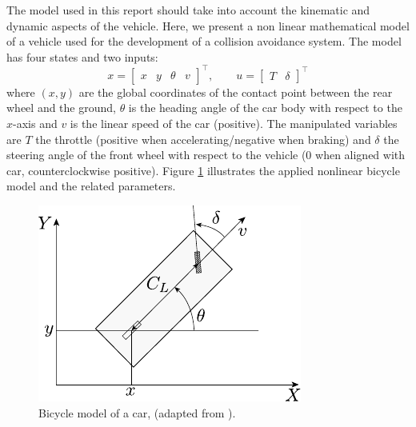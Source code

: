 \documentclass[conference,11pt]{IEEEtran}
\renewcommand{\vec}[1]{\ensuremath{\boldsymbol{\mathit{#1}}}}
\begin{document}
The model used in this report should take into account the kinematic and dynamic aspects of the vehicle. Here, we present a non linear mathematical model of a vehicle used for the development of a collision avoidance system.
The model has four states and two inputs:
\begin{equation*} 
\vec{x}=\begin{bmatrix}
   x&y&\theta&v 
  \end{bmatrix}^\intercal
,\qquad 
\vec{u}=\begin{bmatrix}
T&\delta 
\end{bmatrix}^\intercal
\end{equation*}
where $(x,y)$ are the global coordinates of the contact point between the rear wheel and the ground, $\theta$ is the heading angle of the car body with respect to the $x$-axis and $v$ is the linear speed of the car (positive). The manipulated variables are $T$ the throttle (positive when accelerating/negative when braking) and $\delta$ the steering angle of the front wheel with respect to the vehicle ($0$ when aligned with car, counterclockwise positive). Figure \ref{fig:car_model} illustrates the applied nonlinear bicycle model and the related parameters.
\begin{figure}[H]
	\centering
	\includegraphics[width=
	0.80\columnwidth]{./figure/car_model.pdf}
	\caption{Bicycle model of a car, (adapted from \cite{siciliano}).}
	\label{fig:car_model}
\end{figure}
\end{document}
